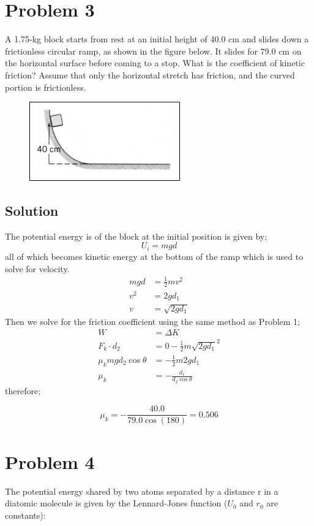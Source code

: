\documentclass{article}
\begin{document}
\section*{Problem 3}
A 1.75-kg block starts from rest at an initial height of 40.0 cm and slides down a frictionless circular ramp,
as shown in the figure below. It slides for 79.0 cm on the horizontal surface before coming to a stop. What is
the coefficient of kinetic friction? Assume that only the horizontal stretch has friction, and the curved portion
is frictionless.

\begin{figure}[ht]
    \centering
    \includegraphics[scale=.5]{drawing-2.png}
\end{figure}

\subsection*{Solution}
The potential energy is of the block at the initial position is given by;
\[
	U_i = mgd
\]
all of which becomes kinetic energy at the bottom of the ramp which is used to solve for velocity.
\begin{align*}
	mgd &= \frac{1}{2} mv^2 \\
	v^2 &= 2gd_1 \\
	v &= \sqrt{2gd_1}
\end{align*}
Then we solve for the friction coefficient using the same method as Problem 1;
\begin{align*}
	W &= \Delta K \\
	F_k \cdot d_2 &= 0 - \frac{1}{2}m \sqrt{2gd_1}^2 \\
	\mu_k mg d_2 \cos \theta &= - \frac{1}{2}m2gd_1 \\
	\mu_k &= -\frac{d_1}{d_2 \cos \theta}
\end{align*}
therefore;

\[
	\mu_k = -\frac{40.0}{79.0 \cos (180)} = \boxed{0.506}
\]

\section*{Problem 4}
The potential energy shared by two atoms separated by a distance r in a diatomic molecule is given by the
Lennard-Jones function ($U_0$ and $r_0$ are constants):
\end{document}
